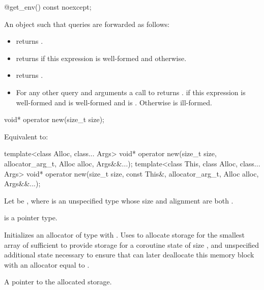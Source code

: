 %
\begin{itemdecl}
@\unspec@ get_env() const noexcept;
\end{itemdecl}
\begin{itemdescr}
\pnum
\returns
An object  such that queries are forwarded as follows:
\begin{itemize}
\item {} returns
.
\item {} returns
if this expression is well-formed and
 otherwise.
\item {} returns
.
\item For any other query  and arguments  a
call to  returns
.  if this expression
is well-formed and  is well-formed and is .
Otherwise  is ill-formed.
\end{itemize}
\end{itemdescr}

%
\begin{itemdecl}
void* operator new(size_t size);
\end{itemdecl}

\begin{itemdescr}
\pnum
\effects
Equivalent to:
\end{itemdescr}

%
\begin{itemdecl}
template<class Alloc, class... Args>
  void* operator new(size_t size, allocator_arg_t, Alloc alloc, Args&&...);
template<class This, class Alloc, class... Args>
  void* operator new(size_t size, const This&, allocator_arg_t, Alloc alloc, Args&&...);
\end{itemdecl}
\begin{itemdescr}
\pnum
Let  be
,
where  is an unspecified type
whose size and alignment are both .

\pnum
\mandates
{} is a pointer type.

\pnum
\effects
Initializes an allocator  of type  with
.
Uses  to allocate storage for the
smallest array of  sufficient to provide storage for a
coroutine state of size , and unspecified additional
state necessary to ensure that  can later
deallocate this memory block with an allocator equal to .

\pnum
\returns
A pointer to the allocated storage.
\end{itemdescr}

